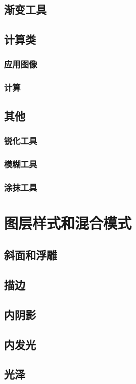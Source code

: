 \section{渐变工具}
\newpage 
\section{计算类}
\newpage
\subsection{应用图像}
\newpage
\subsection{计算}
\newpage
\section{其他}
\newpage
\subsection{锐化工具}
\newpage
\subsection{模糊工具}
\newpage
\subsection{涂抹工具}
\newpage
\chapter{图层样式和混合模式}
\section{斜面和浮雕}
\newpage
\section{描边}
\newpage
\section{内阴影}
\newpage
\section{内发光}
\newpage
\section{光泽}
\newpage
